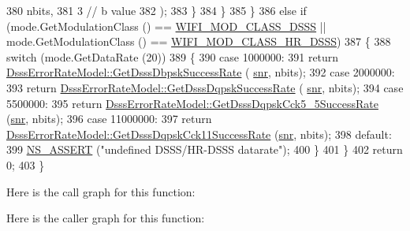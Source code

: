 \begin{DoxyCode}
380                                        nbits,
381                                        3    \textcolor{comment}{// b value}
382                                        );
383             \}
384         \}
385     \}
386   \textcolor{keywordflow}{else} \textcolor{keywordflow}{if} (mode.GetModulationClass () == \hyperlink{namespacens3_aa999e1221606a2b21b1eb33c2007c217aed8070e1ee089724d73fe63030cc112c}{WIFI\_MOD\_CLASS\_DSSS} || mode.GetModulationClass 
      () == \hyperlink{namespacens3_aa999e1221606a2b21b1eb33c2007c217a3c847bbae970f2de31e7b4eb7ff49840}{WIFI\_MOD\_CLASS\_HR\_DSSS})
387     \{
388       \textcolor{keywordflow}{switch} (mode.GetDataRate (20))
389         \{
390         \textcolor{keywordflow}{case} 1000000:
391           \textcolor{keywordflow}{return} \hyperlink{classns3_1_1DsssErrorRateModel_a3c17f87b4f4c5f8adf8570c96f437fd5}{DsssErrorRateModel::GetDsssDbpskSuccessRate} (
      \hyperlink{lte__amc_8m_a7543c5e4e80c828b652e0c63e4a6de70}{snr}, nbits);
392         \textcolor{keywordflow}{case} 2000000:
393           \textcolor{keywordflow}{return} \hyperlink{classns3_1_1DsssErrorRateModel_a40ce71636bd41030cfff29ccea38c588}{DsssErrorRateModel::GetDsssDqpskSuccessRate} (
      \hyperlink{lte__amc_8m_a7543c5e4e80c828b652e0c63e4a6de70}{snr}, nbits);
394         \textcolor{keywordflow}{case} 5500000:
395           \textcolor{keywordflow}{return} \hyperlink{classns3_1_1DsssErrorRateModel_a1ec2c9a616b90b2b72871ea48d7d6fb8}{DsssErrorRateModel::GetDsssDqpskCck5\_5SuccessRate}
       (\hyperlink{lte__amc_8m_a7543c5e4e80c828b652e0c63e4a6de70}{snr}, nbits);
396         \textcolor{keywordflow}{case} 11000000:
397           \textcolor{keywordflow}{return} \hyperlink{classns3_1_1DsssErrorRateModel_acce1c4e4eb5b4df017a302b66ec230be}{DsssErrorRateModel::GetDsssDqpskCck11SuccessRate}
       (\hyperlink{lte__amc_8m_a7543c5e4e80c828b652e0c63e4a6de70}{snr}, nbits);
398         \textcolor{keywordflow}{default}:
399           \hyperlink{assert_8h_a6dccdb0de9b252f60088ce281c49d052}{NS\_ASSERT} (\textcolor{stringliteral}{"undefined DSSS/HR-DSSS datarate"});
400         \}
401     \}
402   \textcolor{keywordflow}{return} 0;
403 \}
\end{DoxyCode}


Here is the call graph for this function\+:




Here is the caller graph for this function\+:


